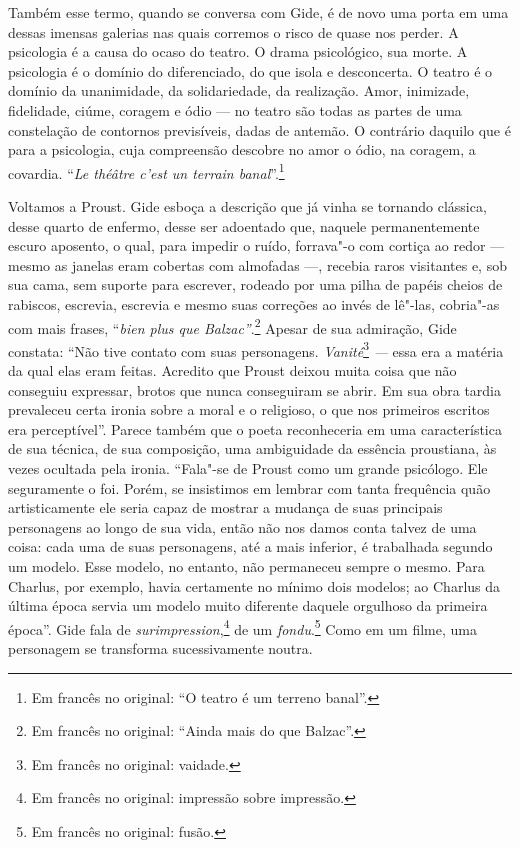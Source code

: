 Também esse termo, quando se conversa com Gide, é de novo uma porta em
uma dessas imensas galerias nas quais corremos o risco de quase nos
perder. A psicologia é a causa do ocaso do teatro. O drama psicológico,
sua morte. A psicologia é o domínio do diferenciado, do que isola e
desconcerta. O teatro é o domínio da unanimidade, da solidariedade, da
realização. Amor, inimizade, fidelidade, ciúme, coragem e ódio --- no
teatro são todas as partes de uma constelação de contornos previsíveis,
dadas de antemão. O contrário daquilo que é para a psicologia, cuja
compreensão descobre no amor o ódio, na coragem, a covardia. ``\emph{Le
théâtre c'est un terrain banal}''.\footnote{Em francês no original: ``O teatro é um terreno banal''. \versal{[N. T.]}}

Voltamos a Proust. Gide esboça a descrição que já vinha se tornando
clássica, desse quarto de enfermo, desse ser adoentado que, naquele
permanentemente escuro aposento, o qual, para impedir o ruído, forrava"-o
com cortiça ao redor --- mesmo as janelas eram cobertas com almofadas ---,
recebia raros visitantes e, sob sua cama, sem suporte para escrever,
rodeado por uma pilha de papéis cheios de rabiscos, escrevia, escrevia e
mesmo suas correções ao invés de lê"-las, cobria"-as com mais frases,
``\emph{bien plus que Balzac''}.\footnote{Em francês no original: ``Ainda mais do que
  Balzac''. \versal{[N. T.]}} Apesar de sua admiração, Gide constata: ``Não tive
contato com suas personagens. \emph{Vanité}\footnote{Em francês no original: vaidade. \versal{[N. T.]}} \emph{---} essa era a matéria da qual elas eram feitas. Acredito que
Proust deixou muita coisa que não conseguiu expressar, brotos que nunca
conseguiram se abrir. Em sua obra tardia prevaleceu certa ironia sobre a
moral e o religioso, o que nos primeiros escritos era perceptível''.
Parece também que o poeta reconheceria em uma característica de sua
técnica, de sua composição, uma ambiguidade da essência proustiana, às
vezes ocultada pela ironia. ``Fala"-se de Proust como um grande
psicólogo. Ele seguramente o foi. Porém, se insistimos em lembrar com
tanta frequência quão artisticamente ele seria capaz de mostrar a
mudança de suas principais personagens ao longo de sua vida, então não
nos damos conta talvez de uma coisa: cada uma de suas personagens, até a
mais inferior, é trabalhada segundo um modelo. Esse modelo, no entanto,
não permaneceu sempre o mesmo. Para Charlus, por exemplo, havia
certamente no mínimo dois modelos; ao Charlus da última época servia um
modelo muito diferente daquele orgulhoso da primeira época''. Gide fala
de \emph{surimpression},\footnote{Em francês no original: impressão sobre impressão. \versal{[N. T.]}} de um \emph{fondu}.\footnote{Em francês no original: fusão. \versal{[N. T.]}} Como em um filme, uma personagem se transforma sucessivamente
noutra.

